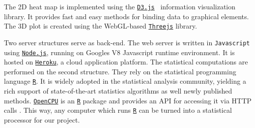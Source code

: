 \documentclass[journal]{style/vgtc} 			          %
\begin{document}
The 2D heat map is implemented using the \href{http://d3js.org/}{\texttt{D3.js}}~\cite{D3} information visualization library.
It provides fast and easy methods for binding data to graphical elements.
The 3D plot is created using the WebGL-based \href{http://threejs.org}{\texttt{Threejs}} library.

Two server structures serve as back-end.
The web server is written in \texttt{Javascript} using \href{http://nodejs.org}{\texttt{Node.js}}, running on Googles V8 Javascript runtime environment.
It is hosted on \href{https://www.heroku.com/}{\texttt{Heroku}}, a cloud application platform.
The statistical computations are performed on the second structure.
They rely on the statistical programming language \href{http://r-project.org}{\texttt{R}}.
It is widely adopted in the statistical analysis community, yielding a rich support of state-of-the-art statistics algorithms as well newly published methods.
\href{https://www.opencpu.org/}{\texttt{OpenCPU}} is an \href{http://r-project.org}{\texttt{R}} package and provides an API for accessing it via HTTP calls \cite{Ooms}.
This way, any computer which runs \href{http://r-project.org}{\texttt{R}} can be turned into a statistical processor for our project.
\end{document}

